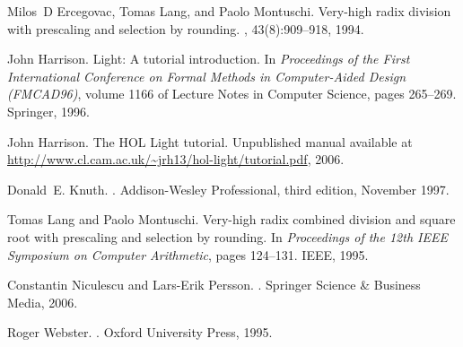 \documentclass[10pt]{article}
\theoremstyle{definition}
\theoremstyle{remark}
\numberwithin{equation}{section}
\begin{document}
\begin{thebibliography}{10}
Milos~D Ercegovac, Tomas Lang, and Paolo Montuschi.
\newblock Very-high radix division with prescaling and selection by rounding.
, 43(8):909--918, 1994.

John Harrison.
 {L}ight: {A} tutorial introduction.
\newblock In {\em Proceedings of the First International Conference on Formal
  Methods in Computer-Aided Design (FMCAD96)}, volume 1166 of Lecture Notes in
  Computer Science, pages 265--269. Springer, 1996.

John Harrison.
\newblock The {HOL} {L}ight tutorial.
\newblock Unpublished manual available at
  {\url{http://www.cl.cam.ac.uk/~jrh13/hol-light/tutorial.pdf}}, 2006.

Donald~E. Knuth.
.
\newblock Addison-Wesley Professional, third edition, November 1997.

Tomas Lang and Paolo Montuschi.
\newblock Very-high radix combined division and square root with prescaling and
  selection by rounding.
\newblock In {\em Proceedings of the 12th IEEE Symposium on Computer
  Arithmetic}, pages 124--131. IEEE, 1995.

Constantin Niculescu and Lars-Erik Persson.
.
\newblock Springer Science \& Business Media, 2006.

Roger Webster.
.
\newblock Oxford University Press, 1995.

\end{thebibliography}
\end{document}

